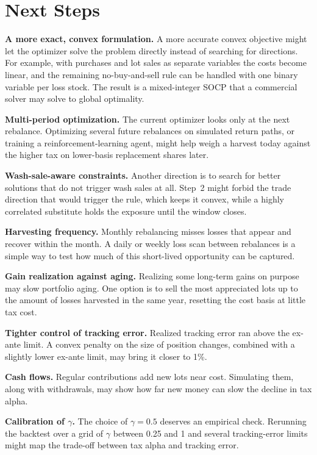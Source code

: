 \section{Next Steps}
\label{sec:next}

\textbf{A more exact, convex formulation.} A more accurate convex objective might let the optimizer solve the problem directly instead of searching for directions. For example, with purchases and lot sales as separate variables the costs become linear, and the remaining no-buy-and-sell rule can be handled with one binary variable per loss stock. The result is a mixed-integer SOCP that a commercial solver may solve to global optimality.

\textbf{Multi-period optimization.} The current optimizer looks only at the next rebalance. Optimizing several future rebalances on simulated return paths, or training a reinforcement-learning agent, might help weigh a harvest today against the higher tax on lower-basis replacement shares later.

\textbf{Wash-sale-aware constraints.} Another direction is to search for better solutions that do not trigger wash sales at all. Step~2 might forbid the trade direction that would trigger the rule, which keeps it convex, while a highly correlated substitute holds the exposure until the window closes.

\textbf{Harvesting frequency.} Monthly rebalancing misses losses that appear and recover within the month. A daily or weekly loss scan between rebalances is a simple way to test how much of this short-lived opportunity can be captured.

\textbf{Gain realization against aging.} Realizing some long-term gains on purpose may slow portfolio aging. One option is to sell the most appreciated lots up to the amount of losses harvested in the same year, resetting the cost basis at little tax cost.

\textbf{Tighter control of tracking error.} Realized tracking error ran above the ex-ante limit. A convex penalty on the size of position changes, combined with a slightly lower ex-ante limit, may bring it closer to 1\%.

\textbf{Cash flows.} Regular contributions add new lots near cost. Simulating them, along with withdrawals, may show how far new money can slow the decline in tax alpha.

\textbf{Calibration of $\gamma$.} The choice of $\gamma=0.5$ deserves an empirical check. Rerunning the backtest over a grid of $\gamma$ between 0.25 and 1 and several tracking-error limits might map the trade-off between tax alpha and tracking error.
